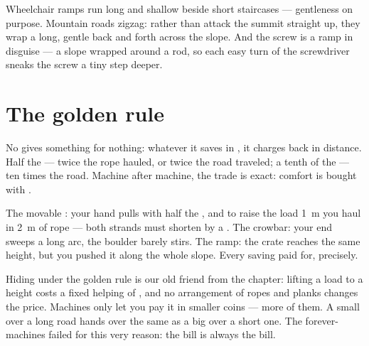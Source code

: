 \begin{example}\label{ex:g5:simple-machines:ramps}
Wheelchair ramps run long and shallow beside short staircases ---
gentleness on purpose. Mountain roads zigzag: rather than attack
the summit straight up, they wrap a long, gentle 
back and forth across the slope. And the screw is a ramp in
disguise --- a slope wrapped around a rod, so each easy turn of the
screwdriver sneaks the screw a tiny step deeper.
\end{example}

\section{The golden rule}

\begin{proposition}\label{prop:g5:simple-machines:golden}
No  gives something for nothing: whatever it saves in
, it charges back in distance. Half the  --- twice the
rope hauled, or twice the road traveled; a tenth of the  ---
ten times the road. Machine after machine, the trade is exact:
comfort is bought with .
\end{proposition}

\begin{example}\label{ex:g5:simple-machines:check}
The movable : your hand pulls with half the , and to
raise the load \qty{1}{m} you haul in \qty{2}{m} of rope --- both
strands must shorten by a . The crowbar: your end sweeps a
long arc, the boulder barely stirs. The ramp: the crate reaches the
same height, but you pushed it along the whole slope. Every saving
paid for, precisely.
\end{example}

\begin{remark}\label{rem:g5:simple-machines:whygolden}
Hiding under the golden rule is our old friend from the 
chapter: lifting a load to a height costs a fixed helping of
, and no arrangement of ropes and planks changes the price.
Machines only let you pay it in smaller coins --- more of them. A
small  over a long road hands over the same  as a big
 over a short one. The forever-machines failed for this very
reason: the bill is always the bill.
\end{remark}

